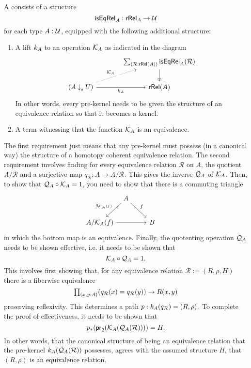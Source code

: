 \begin{defn}\label{defn:system}
A  consists of a structure
\begin{equation*}
\mathsf{isEqRel}_A:\mathsf{rRel}_A\to\mathcal{U}
\end{equation*}
for each type $A:\mathcal{U}$, equipped with the following additional structure:
\begin{enumerate}
\item A lift $k_A$ to an operation $\mathcal{K}_A$ as indicated in the diagram
\begin{equation*}
\begin{tikzcd}[column sep=large]
& \sm{\mathcal{R}:\mathsf{rRel}(A)}\mathsf{isEqRel}_A(\mathcal{R}) \arrow[d,->>] \\
(A \mathbin{{\downarrow}_s} U) \arrow[r,swap,"\prekersym_A"] \arrow[ur,densely dotted,"\kersym_A"] & \mathsf{rRel}(A)
\end{tikzcd}
\end{equation*}
In other words, every pre-kernel needs to be given the structure of an equivalence relation so that it becomes a kernel.
\item A term witnessing that the function $\mathcal{K}_A$ is an equivalence.
\end{enumerate}
\end{defn}

The first requirement just means that any pre-kernel must possess (in a canonical way) the structure of a homotopy coherent equivalence relation. The second requirement involves finding for every equivalence relation $\mathcal{R}$ on $A$, the quotient $A/\mathcal{R}$ and a surjective map $q_{\mathcal{R}} : A\to A/\mathcal{R}$. This gives the inverse $\mathcal{Q}_A$ of $\mathcal{K}_A$. Then, to show that $\mathcal{Q}_A\circ \mathcal{K}_A=1$, you need to show that there is a commuting triangle
\begin{equation*}
\begin{tikzcd}[column sep=tiny]
& A \arrow[dl,swap,"q_{\kersym_A(f)}"] \arrow[dr,"f"] & \phantom{A/\kersym_A(f)} \\
A/\kersym_A(f) \arrow[rr] & & B
\end{tikzcd}
\end{equation*}
in which the bottom map is an equivalence. Finally, the quotenting operation $\mathcal{Q}_A$ needs to be shown effective, i.e. it needs to be shown that \[\mathcal{K}_A\circ \mathcal{Q}_A =1.\]
This involves first showing that, for any equivalence relation $\mathcal{R}:=(R,\rho,H)$ there is a fiberwise equivalence
\begin{equation*}
\prd{x,y:A} (q_{\mathcal{R}}(x)=q_{\mathcal{R}}(y)) \to{} R(x,y)
\end{equation*}
preserving reflexivity. This determines a path $p : k_A(q_{\mathcal{R}})=(R,\rho)$. To complete the proof of effectiveness, it needs to be shown that \[{p}_{*}\mathopen{}\left({\mathsf{pr}_2(\mathcal{K}_A(\mathcal{Q}_A(\mathcal{R})))}\right)\mathclose{}= H.\] 
In other words, that the canonical structure of being an equivalence relation that the pre-kernel $k_A(\mathcal{Q}_A(\mathcal{R}))$ possesses, agrees with the assumed structure $H$, that $(R,\rho)$ is an equivalence relation.

